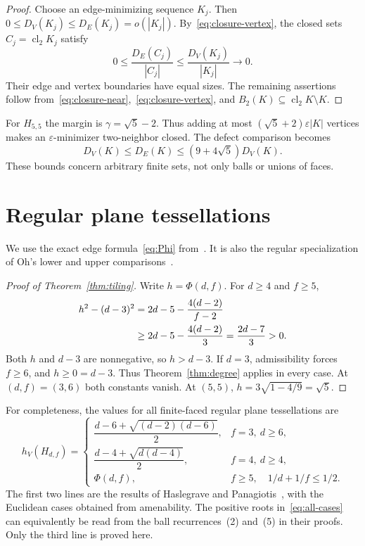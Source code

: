 \documentclass[11pt]{amsart}
\numberwithin{equation}{section}
\theoremstyle{definition}
\theoremstyle{remark}
\newcommand{\hV}{h_V}
\newcommand{\cl}{\operatorname{cl}_2}
\begin{document}
\begin{proof}
Choose an edge-minimizing sequence $K_j$. Then $0\le D_V(K_j)\le D_E(K_j)=o(|K_j|)$. By~\eqref{eq:closure-vertex}, the closed sets $C_j=\cl K_j$ satisfy
\[
0\le\frac{D_E(C_j)}{|C_j|}\le\frac{D_V(K_j)}{|K_j|}\longrightarrow0.
\]
Their edge and vertex boundaries have equal sizes. The remaining assertions follow from~\eqref{eq:closure-near},~\eqref{eq:closure-vertex}, and $B_2(K)\subseteq\cl K\setminus K$.
\end{proof}

For $H_{5,5}$ the margin is $\gamma=\sqrt5-2$. Thus adding at most $(\sqrt5+2)\varepsilon|K|$ vertices makes an $\varepsilon$-minimizer two-neighbor closed. The defect comparison becomes
\[
D_V(K)\le D_E(K)\le(9+4\sqrt5)D_V(K).
\]
These bounds concern arbitrary finite sets, not only balls or unions of faces.

\section{Regular plane tessellations}\label{sec:tessellations}
We use the exact edge formula~\eqref{eq:Phi} from~\cite{HJL,HS}. It is also the regular specialization of Oh's lower and upper comparisons~\cite[Theorems~1, 3, and~4]{Oh}.

\begin{proof}[Proof of Theorem~\ref{thm:tiling}]
Write $h=\Phi(d,f)$. For $d\ge4$ and $f\ge5$,
\begin{align}
h^2-(d-3)^2
&=2d-5-\frac{4(d-2)}{f-2}\notag\\
&\ge2d-5-\frac{4(d-2)}3
=\frac{2d-7}{3}>0.\label{eq:tiling-threshold}
\end{align}
Both $h$ and $d-3$ are nonnegative, so $h>d-3$. If $d=3$, admissibility forces $f\ge6$, and $h\ge0=d-3$. Thus Theorem~\ref{thm:degree} applies in every case. At $(d,f)=(3,6)$ both constants vanish. At $(5,5)$, $h=3\sqrt{1-4/9}=\sqrt5$.
\end{proof}

For completeness, the values for all finite-faced regular plane tessellations are
\begin{equation}\label{eq:all-cases}
\hV(H_{d,f})=
\begin{cases}
\dfrac{d-6+\sqrt{(d-2)(d-6)}}2,&f=3,\ d\ge6,\\[2mm]
\dfrac{d-4+\sqrt{d(d-4)}}2,&f=4,\ d\ge4,\\[2mm]
\Phi(d,f),&f\ge5,\quad 1/d+1/f\le1/2.
\end{cases}
\end{equation}
The first two lines are the results of Haslegrave and Panagiotis~\cite[Theorems~18 and~23]{HP}, with the Euclidean cases obtained from amenability. The positive roots in~\eqref{eq:all-cases} can equivalently be read from the ball recurrences~(2) and~(5) in their proofs. Only the third line is proved here.
\end{document}
